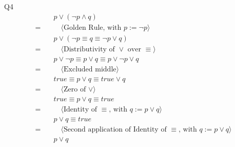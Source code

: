 \documentclass{article}
\begin{document}
    \newpage
    Q4
    \begin{align*}
        & \quad p \vee (\neg p \land q) \\
        = & \quad\quad \langle \text{Golden Rule, with } p := \neg p  \rangle \\
        & \quad p \vee (\neg p \equiv q \equiv \neg p \vee q) \\
        = & \quad\quad \langle \text{Distributivity of } \vee \text{ over } \equiv \rangle \\
        & \quad p \vee \neg p \equiv p \vee q \equiv p \vee \neg p \vee q \\
        = & \quad\quad \langle \text{Excluded middle} \rangle \\
        & \quad true \equiv p \vee q \equiv true \vee q \\
        = & \quad\quad \langle \text{Zero of } \vee \rangle \\
        & \quad true \equiv p \vee q \equiv true \\
        = & \quad\quad \langle \text{Identity of } \equiv \text{, with } q := p \vee q \rangle \\
        & \quad p \vee q \equiv true \\
        = & \quad\quad \langle \text{Second application of Identity of } \equiv \text{, with } q := p \vee q \rangle \\
        & \quad p \vee q \\
    \end{align*}
\end{document}
